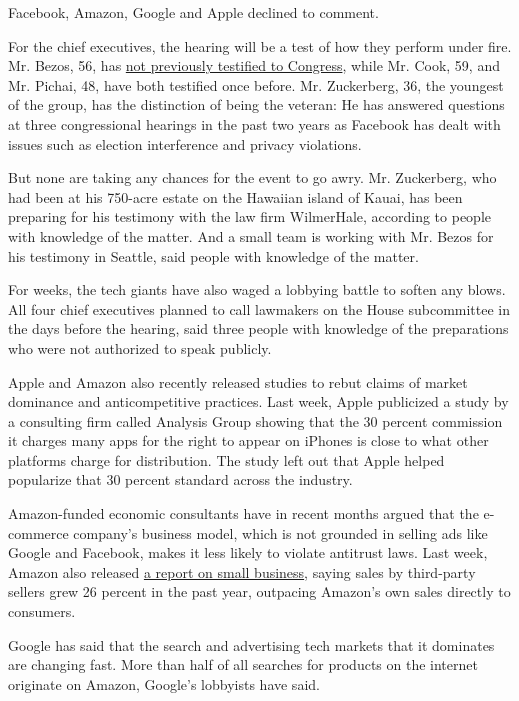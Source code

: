 Facebook, Amazon, Google and Apple declined to comment.

For the chief executives, the hearing will be a test of how they perform
under fire. Mr. Bezos, 56, has
\href{https://www.nytimes.com/2020/07/27/business/jeff-bezos-amazon-congress.html?action=click\&module=News\&pgtype=Homepage}{not
previously testified to Congress}, while Mr. Cook, 59, and Mr. Pichai,
48, have both testified once before. Mr. Zuckerberg, 36, the youngest of
the group, has the distinction of being the veteran: He has answered
questions at three congressional hearings in the past two years as
Facebook has dealt with issues such as election interference and privacy
violations.

But none are taking any chances for the event to go awry. Mr.
Zuckerberg, who had been at his 750-acre estate on the Hawaiian island
of Kauai, has been preparing for his testimony with the law firm
WilmerHale, according to people with knowledge of the matter. And a
small team is working with Mr. Bezos for his testimony in Seattle, said
people with knowledge of the matter.

For weeks, the tech giants have also waged a lobbying battle to soften
any blows. All four chief executives planned to call lawmakers on the
House subcommittee in the days before the hearing, said three people
with knowledge of the preparations who were not authorized to speak
publicly.

Apple and Amazon also recently released studies to rebut claims of
market dominance and anticompetitive practices. Last week, Apple
publicized a study by a consulting firm called Analysis Group showing
that the 30 percent commission it charges many apps for the right to
appear on iPhones is close to what other platforms charge for
distribution. The study left out that Apple helped popularize that 30
percent standard across the industry.

Amazon-funded economic consultants have in recent months argued that the
e-commerce company's business model, which is not grounded in selling
ads like Google and Facebook, makes it less likely to violate antitrust
laws. Last week, Amazon also released
\href{https://blog.aboutamazon.com/small-business/small-business-success-in-challenging-times}{a
report on small business}, saying sales by third-party sellers grew 26
percent in the past year, outpacing Amazon's own sales directly to
consumers.

Google has said that the search and advertising tech markets that it
dominates are changing fast. More than half of all searches for products
on the internet originate on Amazon, Google's lobbyists have said.

